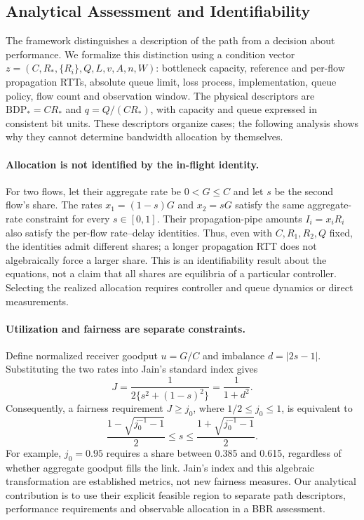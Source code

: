 \subsection{Analytical Assessment and Identifiability}
\label{sec:analytical_assessment}

The framework distinguishes a description of the path from a decision about
performance. We formalize this distinction using a condition vector
$z=(C,R_*,\{R_i\},Q,L,v,A,n,W)$: bottleneck capacity, reference and
per-flow propagation RTTs, absolute queue limit, loss process, implementation,
queue policy, flow count and observation window. The physical descriptors are
$\mathrm{BDP}_*=CR_*$ and $q=Q/(CR_*)$, with capacity and queue expressed
in consistent bit units. These descriptors organize cases; the following
analysis shows why they cannot determine bandwidth allocation by themselves.

\paragraph{Allocation is not identified by the in-flight identity.}
For two flows, let their aggregate rate be $0<G\leq C$ and let $s$ be the
second flow's share. The rates $x_1=(1-s)G$ and $x_2=sG$ satisfy the same
aggregate-rate constraint for every $s\in[0,1]$. Their propagation-pipe
amounts $I_i=x_iR_i$ also satisfy the per-flow rate--delay identities.
Thus, even with $C,R_1,R_2,Q$ fixed, the identities admit different shares;
a longer propagation RTT does not algebraically force a larger share.
This is an identifiability result about the equations, not a claim that all
shares are equilibria of a particular controller. Selecting the realized
allocation requires controller and queue dynamics or direct measurements.

\paragraph{Utilization and fairness are separate constraints.}
Define normalized receiver goodput $u=G/C$ and imbalance
$d=|2s-1|$. Substituting the two rates into Jain's standard index
\citep{jain1984fairness} gives
\begin{equation}
 J=\frac{1}{2\{s^2+(1-s)^2\}}=\frac{1}{1+d^2}.
 \label{eq:share_jain}
\end{equation}
Consequently, a fairness requirement $J\geq j_0$, where
$1/2\leq j_0\leq1$, is equivalent to
\begin{equation}
 \frac{1-\sqrt{j_0^{-1}-1}}{2}\leq s\leq
 \frac{1+\sqrt{j_0^{-1}-1}}{2}.
 \label{eq:share_acceptance}
\end{equation}
For example, $j_0=0.95$ requires a share between 0.385 and 0.615,
regardless of whether aggregate goodput fills the link. Jain's index and
this algebraic transformation are established metrics, not new fairness
measures. Our analytical contribution is to use their explicit feasible
region to separate path descriptors, performance requirements and observable
allocation in a BBR assessment.

